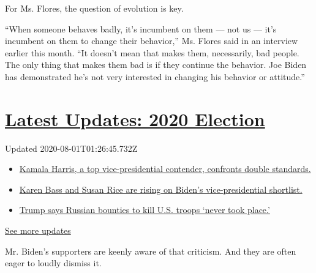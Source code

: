 For Ms. Flores, the question of evolution is key.

``When someone behaves badly, it's incumbent on them --- not us --- it's
incumbent on them to change their behavior,'' Ms. Flores said in an
interview earlier this month. ``It doesn't mean that makes them,
necessarily, bad people. The only thing that makes them bad is if they
continue the behavior. Joe Biden has demonstrated he's not very
interested in changing his behavior or attitude.''

\hypertarget{latest-updates-2020-election}{%
\section{\texorpdfstring{\href{https://www.nytimes.com/2020/07/31/us/elections/biden-vs-trump.html?action=click\&pgtype=Article\&state=default\&region=MAIN_CONTENT_1\&context=storylines_live_updates}{Latest
Updates: 2020
Election}}{Latest Updates: 2020 Election}}\label{latest-updates-2020-election}}

Updated 2020-08-01T01:26:45.732Z

\begin{itemize}
\tightlist
\item
  \href{https://www.nytimes.com/2020/07/31/us/elections/biden-vs-trump.html?action=click\&pgtype=Article\&state=default\&region=MAIN_CONTENT_1\&context=storylines_live_updates\#link-29fdff45}{Kamala
  Harris, a top vice-presidential contender, confronts double
  standards.}
\item
  \href{https://www.nytimes.com/2020/07/31/us/elections/biden-vs-trump.html?action=click\&pgtype=Article\&state=default\&region=MAIN_CONTENT_1\&context=storylines_live_updates\#link-13ec3d9c}{Karen
  Bass and Susan Rice are rising on Biden's vice-presidential
  shortlist.}
\item
  \href{https://www.nytimes.com/2020/07/31/us/elections/biden-vs-trump.html?action=click\&pgtype=Article\&state=default\&region=MAIN_CONTENT_1\&context=storylines_live_updates\#link-49e9a016}{Trump
  says Russian bounties to kill U.S. troops `never took place.'}
\end{itemize}

\href{https://www.nytimes.com/2020/07/31/us/elections/biden-vs-trump.html?action=click\&pgtype=Article\&state=default\&region=MAIN_CONTENT_1\&context=storylines_live_updates}{See
more updates}

Mr. Biden's supporters are keenly aware of that criticism. And they are
often eager to loudly dismiss it.

